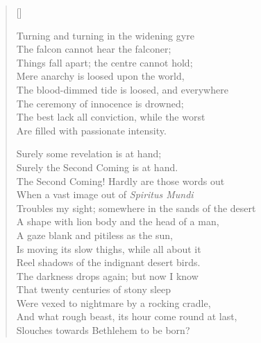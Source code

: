 \documentclass{article}
\begin{document}
\settowidth{\versewidth}{A Shape with lion body and the head of a man,}

\newcommand{\attrib}[1]{%
  \nopagebreak{\raggedleft\footnotesize #1\par}}

\begin{verse}[\versewidth]

Turning and turning in the widening gyre \\
The falcon cannot hear the falconer; \\
Things fall apart; the centre cannot hold; \\
Mere anarchy is loosed upon the world, \\
The blood-dimmed tide is loosed, and everywhere \\
The ceremony of innocence is drowned; \\
The best lack all conviction, while the worst \\
Are filled with passionate intensity.

Surely some revelation is at hand; \\
Surely the Second Coming is at hand. \\
The Second Coming! Hardly are those words out \\
When a vast image out of \textit{Spiritus Mundi} \\
Troubles my sight; somewhere in the sands of the desert \\
A shape with lion body and the head of a man, \\
A gaze blank and pitiless as the sun, \\
Is moving its slow thighs, while all about it \\
Reel shadows of the indignant desert birds. \\
The darkness drops again; but now I know \\
That twenty centuries of stony sleep \\
Were vexed to nightmare by a rocking cradle, \\
And what rough beast, its hour come round at last, \\
Slouches towards Bethlehem to be born?


\end{verse}

\attrib{W. B. Yeats (1865-1939)}
\end{document}
